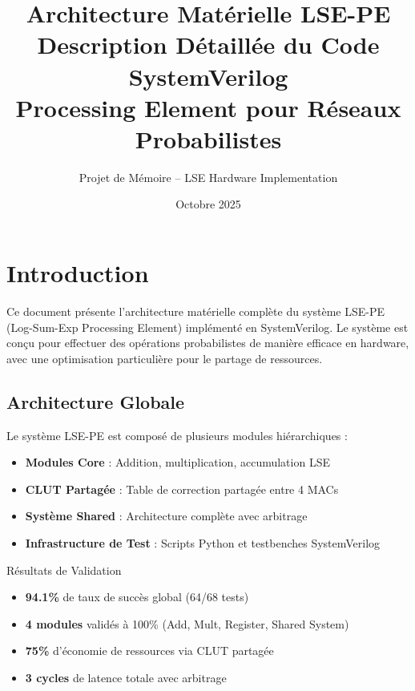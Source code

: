 \documentclass[12pt,a4paper]{article}
\title{
    \Large{\textbf{Architecture Matérielle LSE-PE}} \\
    \large{Description Détaillée du Code SystemVerilog} \\
    \vspace{0.5cm}
    \normalsize{Processing Element pour Réseaux Probabilistes}
}
\author{Projet de Mémoire -- LSE Hardware Implementation}
\date{Octobre 2025}
\begin{document}
\maketitle
\tableofcontents
\newpage

\section{Introduction}

Ce document présente l'architecture matérielle complète du système LSE-PE (Log-Sum-Exp Processing Element) implémenté en SystemVerilog. Le système est conçu pour effectuer des opérations probabilistes de manière efficace en hardware, avec une optimisation particulière pour le partage de ressources.

\subsection{Architecture Globale}

Le système LSE-PE est composé de plusieurs modules hiérarchiques :

\begin{itemize}
    \item \textbf{Modules Core} : Addition, multiplication, accumulation LSE
    \item \textbf{CLUT Partagée} : Table de correction partagée entre 4 MACs
    \item \textbf{Système Shared} : Architecture complète avec arbitrage
    \item \textbf{Infrastructure de Test} : Scripts Python et testbenches SystemVerilog
\end{itemize}

\begin{successbox}{Résultats de Validation}
\begin{itemize}
    \item \textbf{94.1\%} de taux de succès global (64/68 tests)
    \item \textbf{4 modules} validés à 100\% (Add, Mult, Register, Shared System)
    \item \textbf{75\%} d'économie de ressources via CLUT partagée
    \item \textbf{3 cycles} de latence totale avec arbitrage
\end{itemize}
\end{successbox}
\end{document}

